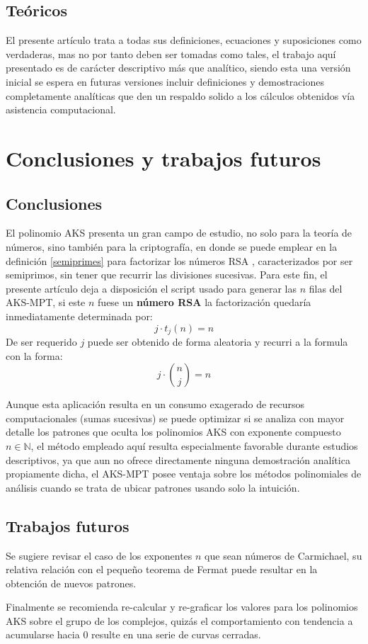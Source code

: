 \documentclass[a4paper, 12pt]{article}
\begin{document}
\subsection{Teóricos}
El presente artículo trata a todas sus definiciones, ecuaciones y suposiciones como verdaderas, mas no por tanto deben ser tomadas como tales, el trabajo aquí presentado es de carácter descriptivo más que analítico, siendo esta una versión inicial se espera en futuras versiones incluir definiciones y demostraciones completamente analíticas que den un respaldo solido a los cálculos obtenidos vía asistencia computacional.




\section{Conclusiones y trabajos futuros}
\subsection{Conclusiones}

El polinomio AKS presenta un gran campo de estudio, no solo para la teoría de números, sino también para la criptografía, en donde se puede emplear en la definición \ref{semiprimes} para factorizar los números RSA \cite[pag. 5 sección V]{RSA}, caracterizados por ser semiprimos, sin tener que recurrir las divisiones sucesivas.
Para este fin, el presente artículo deja a disposición el script usado para generar las $n$ filas del AKS-MPT, si este $n$ fuese un \textbf{número RSA} la factorización quedaría inmediatamente determinada por:
\[ j\cdot t_{j}(n) = n  \]
De ser requerido $j$ puede ser obtenido de forma aleatoria y recurri a la formula con la forma:
\[ j \cdot \binom{n}{j} = n\]

Aunque esta aplicación resulta en un consumo exagerado de recursos computacionales (sumas sucesivas)  se puede optimizar si se analiza con mayor detalle los patrones que oculta los polinomios AKS con exponente compuesto $n \in \mathbb{N}$, el método empleado aquí resulta especialmente favorable durante estudios descriptivos, ya que aun no ofrece directamente ninguna demostración analítica propiamente dicha, el AKS-MPT posee ventaja sobre los métodos polinomiales de análisis cuando se trata de ubicar patrones usando solo la intuición.

 
\subsection{Trabajos futuros}

Se sugiere revisar el caso de los exponentes $n$ que sean números de Carmichael, su relativa relación con el pequeño teorema de Fermat puede resultar en la obtención de nuevos patrones.

Finalmente se recomienda re-calcular y re-graficar los valores para los polinomios AKS sobre el grupo de los complejos, quizás el comportamiento con tendencia a acumularse hacia $0$ resulte en una serie de curvas cerradas.



\end{document}
